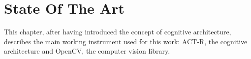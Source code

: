 \chapter{State Of The Art}

  This chapter, after having introduced the concept of cognitive architecture, describes the main working instrument used for this work: \mbox{ACT-R,} the cognitive architecture and \mbox{OpenCV,} the computer vision library. 

